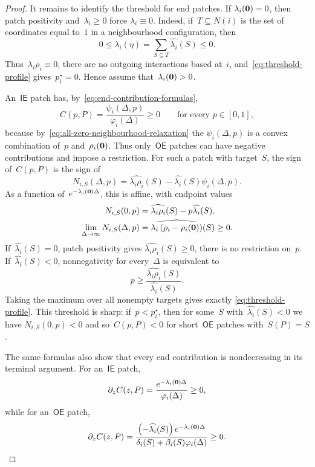 \documentclass[EJP,preprint,NODS,nobera]{ejpecp}
\begin{document}
\begin{proof}
It remains to identify the threshold for end patches. If
$\lambda_i(\mathbf{0})=0$, then patch positivity and~$\lambda_i\geq0$ force
$\lambda_i\equiv0$. Indeed, if~$T\subseteq N(i)$ is the set of coordinates
equal to~$1$ in a neighbourhood configuration, then
\begin{equation*}
0
\leq
\lambda_i(\eta)
=
\sum_{S\subseteq T}\widehat{\lambda_i}(S)
\leq0.
\end{equation*}
Thus~$\lambda_i\rho_i\equiv0$, there are no outgoing interactions based
at~$i$, and~\eqref{eq:threshold-profile} gives~$p_i^\star=0$. Hence assume
that~$\lambda_i(\mathbf{0})>0$.

An~$\mathsf{IE}$ patch has, by~\eqref{eq:end-contribution-formulas},
\begin{equation*}
C(p,P)
=
\frac{\psi_i(\Delta,p)}{\varphi_i(\Delta)}
\geq0
\qquad
\text{for every }p\in[0,1],
\end{equation*}
because by~\eqref{eq:all-zero-neighbourhood-relaxation} the
$\psi_i(\Delta,p)$ is a convex combination of~$p$ and~$\rho_i(\mathbf{0})$.
Thus only~$\mathsf{OE}$ patches can have negative contributions and impose a restriction. For such a patch
with target~$S$, the sign of~$C(p,P)$ is the sign of
\begin{equation*}
N_{i,S}(\Delta,p)
=
\widehat{\lambda_i\rho_i}(S)
-
\widehat{\lambda_i}(S)\psi_i(\Delta,p).
\end{equation*}
As a function of~$e^{-\lambda_i(\mathbf{0})\Delta}$, this is affine, with endpoint
values
\begin{align*}
N_{i,S}(0,p)
&=
\widehat{\lambda_i\rho_i}(S)
-
p\widehat{\lambda_i}(S),
\\
\lim_{\Delta\to\infty}N_{i,S}(\Delta,p)
&=
\widehat{\lambda_i\left(\rho_i-\rho_i(\mathbf{0})\right)}(S)
\geq0.
\end{align*}
If~$\widehat{\lambda_i}(S)=0$, patch positivity gives
$\widehat{\lambda_i\rho_i}(S)\geq0$, there is no restriction on~$p$.
If~$\widehat{\lambda_i}(S)<0$, nonnegativity for every~$\Delta$ is
equivalent to
\begin{equation*}
p
\geq
\frac{\widehat{\lambda_i\rho_i}(S)}
{\widehat{\lambda_i}(S)}.
\end{equation*}
Taking the maximum over all nonempty targets gives exactly
\eqref{eq:threshold-profile}. This threshold is sharp: if~$p<p_i^\star$,
then for some~$S$ with~$\widehat{\lambda_i}(S)<0$ we have
$N_{i,S}(0,p)<0$ and so~$C(p,P)<0$ for short~$\mathsf{OE}$ patches with~$S(P)=S$.

The same formulas also show that every end contribution is nondecreasing in its
terminal argument. For an~$\mathsf{IE}$ patch,
\begin{equation*}
\partial_zC(z,P)
=
\frac{e^{-\lambda_i(\mathbf{0})\Delta}}{\varphi_i(\Delta)}
\geq0,
\end{equation*}
while for an~$\mathsf{OE}$ patch,
\begin{equation*}
\partial_zC(z,P)
=
\frac{
\left(-\widehat{\lambda_i}(S)\right)
e^{-\lambda_i(\mathbf{0})\Delta}
}{
\delta_i(S)+\beta_i(S)\varphi_i(\Delta)
}
\geq0.
\end{equation*}


\end{proof}
\end{document}
